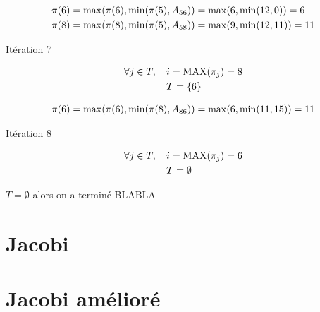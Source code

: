 \documentclass{article}
\begin{document}
\begin{align*}
&\pi(6) = \operatorname{max}(\pi(6), \operatorname{min}(\pi(5), A_{56})) = \operatorname{max}(6, \operatorname{min}(12,0)) = 6\\
&\pi(8) = \operatorname{max}(\pi(8), \operatorname{min}(\pi(5), A_{58})) = \operatorname{max}(9, \operatorname{min}(12,11)) = 11
\end{align*}

\underline{Itération 7}

\begin{align*}
  \forall j \in T,\;\;\;\; &i = \operatorname{MAX}(\pi_j) = 8\\
  &T = \{6\}
\end{align*}

\begin{align*}
&\pi(6) = \operatorname{max}(\pi(6), \operatorname{min}(\pi(8), A_{86})) = \operatorname{max}(6, \operatorname{min}(11,15)) = 11\\
\end{align*}

\underline{Itération 8}

\begin{align*}
  \forall j \in T,\;\;\;\; &i = \operatorname{MAX}(\pi_j) = 6\\
  &T = \emptyset
\end{align*}

$T = \emptyset$ alors on a terminé BLABLA

\section{Jacobi}

\section{Jacobi amélioré}
\end{document}

